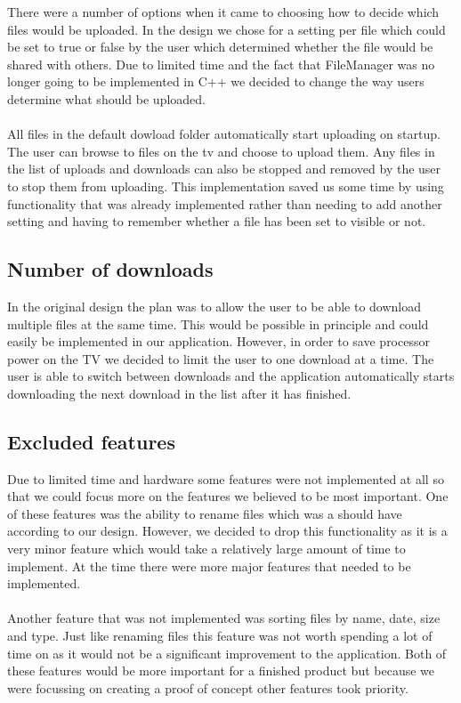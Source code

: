 There were a number of options when it came to choosing how to decide which files would be uploaded. In the design we chose for a setting per file which could be set to true or false by the user which determined whether the file would be shared with others. Due to limited time and the fact that FileManager was no longer going to be implemented in C++ we decided to change the way users determine what should be uploaded.
\\\\
All files in the default dowload folder automatically start uploading on startup. The user can browse to files on the tv and choose to upload them. Any files in the list of uploads and downloads can also be stopped and removed by the user to stop them from uploading. This implementation saved us some time by using functionality that was already implemented rather than needing to add another setting and having to remember whether a file has been set to visible or not.

\subsection{Number of downloads}

In the original design the plan was to allow the user to be able to download multiple files at the same time. This would be possible in principle and could easily be implemented in our application. However, in order to save processor power on the TV we decided to limit the user to one download at a time. The user is able to switch between downloads and the application automatically starts downloading the next download in the list after it has finished.

\subsection{Excluded features}

Due to limited time and hardware some features were not implemented at all so that we could focus more on the features we believed to be most important. One of these features was the ability to rename files which was a should have according to our design. However, we decided to drop this functionality as it is a very minor feature which would take a relatively large amount of time to implement. At the time there were more major features that needed to be implemented.
\\\\
Another feature that was not implemented was sorting files by name, date, size and type. Just like renaming files this feature was not worth spending a lot of time on as it would not be a significant improvement to the application. Both of these features would be more important for a finished product but because we were focussing on creating a proof of concept other features took priority.
